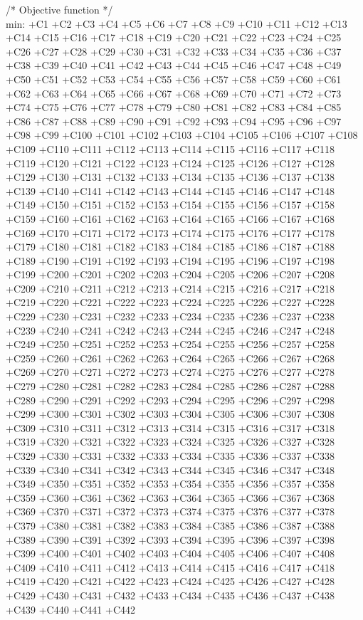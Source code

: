 /* Objective function */ \\
min: +C1 +C2 +C3 +C4 +C5 +C6 +C7 +C8 +C9 +C10 +C11 +C12 +C13 +C14 +C15 +C16 +C17 +C18 +C19 +C20 +C21 +C22
 +C23 +C24 +C25 +C26 +C27 +C28 +C29 +C30 +C31 +C32 +C33 +C34 +C35 +C36 +C37 +C38 +C39 +C40 +C41 +C42
 +C43 +C44 +C45 +C46 +C47 +C48 +C49 +C50 +C51 +C52 +C53 +C54 +C55 +C56 +C57 +C58 +C59 +C60 +C61 +C62
 +C63 +C64 +C65 +C66 +C67 +C68 +C69 +C70 +C71 +C72 +C73 +C74 +C75 +C76 +C77 +C78 +C79 +C80 +C81 +C82
 +C83 +C84 +C85 +C86 +C87 +C88 +C89 +C90 +C91 +C92 +C93 +C94 +C95 +C96 +C97 +C98 +C99 +C100 +C101 +C102
 +C103 +C104 +C105 +C106 +C107 +C108 +C109 +C110 +C111 +C112 +C113 +C114 +C115 +C116 +C117 +C118 +C119
 +C120 +C121 +C122 +C123 +C124 +C125 +C126 +C127 +C128 +C129 +C130 +C131 +C132 +C133 +C134 +C135 +C136
 +C137 +C138 +C139 +C140 +C141 +C142 +C143 +C144 +C145 +C146 +C147 +C148 +C149 +C150 +C151 +C152 +C153
 +C154 +C155 +C156 +C157 +C158 +C159 +C160 +C161 +C162 +C163 +C164 +C165 +C166 +C167 +C168 +C169 +C170
 +C171 +C172 +C173 +C174 +C175 +C176 +C177 +C178 +C179 +C180 +C181 +C182 +C183 +C184 +C185 +C186 +C187
 +C188 +C189 +C190 +C191 +C192 +C193 +C194 +C195 +C196 +C197 +C198 +C199 +C200 +C201 +C202 +C203 +C204
 +C205 +C206 +C207 +C208 +C209 +C210 +C211 +C212 +C213 +C214 +C215 +C216 +C217 +C218 +C219 +C220 +C221
 +C222 +C223 +C224 +C225 +C226 +C227 +C228 +C229 +C230 +C231 +C232 +C233 +C234 +C235 +C236 +C237 +C238
 +C239 +C240 +C241 +C242 +C243 +C244 +C245 +C246 +C247 +C248 +C249 +C250 +C251 +C252 +C253 +C254 +C255
 +C256 +C257 +C258 +C259 +C260 +C261 +C262 +C263 +C264 +C265 +C266 +C267 +C268 +C269 +C270 +C271 +C272
 +C273 +C274 +C275 +C276 +C277 +C278 +C279 +C280 +C281 +C282 +C283 +C284 +C285 +C286 +C287 +C288 +C289
 +C290 +C291 +C292 +C293 +C294 +C295 +C296 +C297 +C298 +C299 +C300 +C301 +C302 +C303 +C304 +C305 +C306
 +C307 +C308 +C309 +C310 +C311 +C312 +C313 +C314 +C315 +C316 +C317 +C318 +C319 +C320 +C321 +C322 +C323
 +C324 +C325 +C326 +C327 +C328 +C329 +C330 +C331 +C332 +C333 +C334 +C335 +C336 +C337 +C338 +C339 +C340
 +C341 +C342 +C343 +C344 +C345 +C346 +C347 +C348 +C349 +C350 +C351 +C352 +C353 +C354 +C355 +C356 +C357
 +C358 +C359 +C360 +C361 +C362 +C363 +C364 +C365 +C366 +C367 +C368 +C369 +C370 +C371 +C372 +C373 +C374
 +C375 +C376 +C377 +C378 +C379 +C380 +C381 +C382 +C383 +C384 +C385 +C386 +C387 +C388 +C389 +C390 +C391
 +C392 +C393 +C394 +C395 +C396 +C397 +C398 +C399 +C400 +C401 +C402 +C403 +C404 +C405 +C406 +C407 +C408
 +C409 +C410 +C411 +C412 +C413 +C414 +C415 +C416 +C417 +C418 +C419 +C420 +C421 +C422 +C423 +C424 +C425
 +C426 +C427 +C428 +C429 +C430 +C431 +C432 +C433 +C434 +C435 +C436 +C437 +C438 +C439 +C440 +C441 +C442
